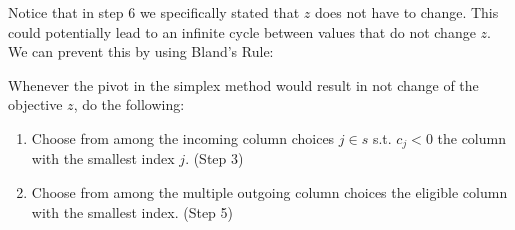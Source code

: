 Notice that in step 6 we specifically stated that $z$ does not have to change. This could potentially lead to an infinite cycle between values that do not change $z$.  We can prevent this by using Bland's Rule:

Whenever the pivot in the simplex method would result in not change of the objective $z$, do the following:
\begin{enumerate}
\item 
Choose from among the incoming column choices $j \in s$  s.t. $c_j < 0$ the column with the smallest index $j$. (Step 3)
\item
Choose from among the multiple outgoing column choices the eligible column with the smallest index. (Step 5)
\end{enumerate}
